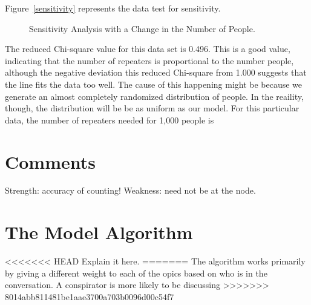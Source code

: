 \documentclass{icmmcm}
\begin{document}
Figure~\ref{sensitivity} represents the data test for sensitivity.
\begin{figure}[ht]
\begin{center}
\end{center}
\caption[Sensitivity of the Model]{Sensitivity Analysis with a Change in the Number of People.\label{sensitivity}}%
\label{fig:sensitivity}
\end{figure}
The reduced Chi-square value for this data set is 0.496. This is a good value, indicating that the number of repeaters is proportional to the number people, although the negative deviation this reduced Chi-square from 1.000 suggests that the line fits the data too well. The cause of this happening might be because we generate an almost completely randomized distribution of people. In the reaility, though, the distribution will be be as uniform as our model. For this particular data, the number of repeaters needed for 1,000 people is 
\section{Comments}
Strength: accuracy of counting!
Weakness: need not be at the node.

\section{The Model Algorithm}
<<<<<<< HEAD
Explain it here.
=======
The algorithm works primarily by giving a different weight to each of the 
opics based on who is in the conversation. 
A conspirator is more likely to be discussing 
>>>>>>> 8014abb811481be1aae3700a703b0096d00c54f7
\end{document}
